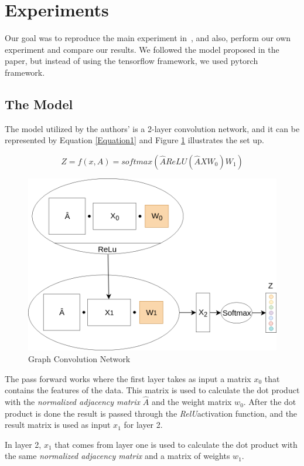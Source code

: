 \section{Experiments}
Our goal was to reproduce the main experiment in~\cite{Kipf2016}, and also, perform our own experiment and compare our results. We followed the model proposed in the paper, but instead of using the tensorflow framework, we used pytorch framework.

\subsection{The Model}
The model utilized by the authors' is a 2-layer convolution network, and it can be represented by Equation \ref{Equation1} and Figure \ref{fig:model} illustrates the set up.

\begin{equation}
    \label{Equation1}
    Z = f(x,A) = softmax(\hat{A}ReLU(\hat{A}XW_{0})W_{1}) 
\end{equation}

\begin{figure}[h!]
  \centering
  \includegraphics[width=0.75\linewidth]{media/model_right.png}
  
  \caption{Graph Convolution Network}
  \label{fig:model}
\end{figure}

The pass forward works where the first layer takes as input a matrix $x_{0}$ that contains the features of the data. This matrix is used to calculate the dot product with the \textit{normalized adjacency matrix} $\hat{A}$ and the weight matrix $w_{0}$. After the dot product is done the result is passed through the \textit{RelU}activation function, and the result matrix is used as input $x_{1}$ for layer 2.

In layer 2, $x_{1}$ that comes from layer one is used to calculate the dot product with the same \textit{normalized adjacency matrix} and a matrix of weights $w_{1}$.

